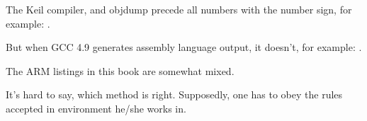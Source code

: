 ﻿


The Keil compiler, \IDA and objdump precede all numbers with the \q{\#} number sign, for example:
.

But when GCC 4.9 generates assembly language output, it doesn't, for example: 
.

The ARM listings in this book are somewhat mixed.

It's hard to say, which method is right.
Supposedly, one has to obey the rules accepted in environment he/she works in.




